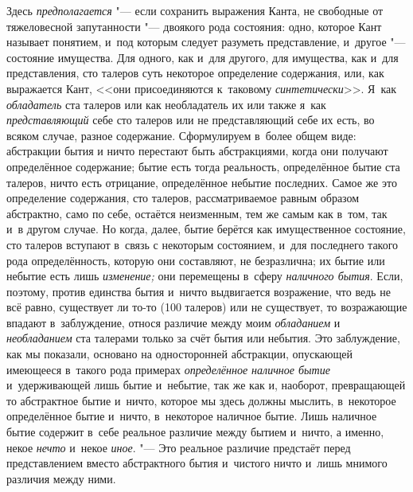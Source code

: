 Здесь {\em предполагается} "--- если сохранить выражения Канта, не свободные от
тяжеловесной запутанности "--- двоякого рода состояния: одно, которое Кант
называет понятием, и~под которым следует разуметь представление, и~другое "---
состояние имущества. Для одного, как и~для другого, для имущества, как и~для
представления, сто талеров суть некоторое определение содержания, или, как
выражается Кант, <<они присоединяются к~таковому {\em синтетически}>>. Я~как
{\em обладатель} ста талеров или как необладатель их или также я~как {\em
представляющий} себе сто талеров или не представляющий себе их есть, во всяком
случае, разное содержание. Сформулируем в~более общем виде: абстракции бытия и
ничто перестают быть абстракциями, когда они получают определённое содержание;
бытие есть тогда реальность, определённое бытие ста талеров, ничто есть
отрицание, определённое небытие последних. Самое же это определение содержания,
сто талеров, рассматриваемое равным образом абстрактно, само по себе, остаётся
неизменным, тем же самым как в~том, так и~в другом случае. Но когда, далее,
бытие берётся как имущественное состояние, сто талеров вступают в~связь с
некоторым состоянием, и~для последнего такого рода определённость, которую они
составляют, не безразлична; их бытие или небытие есть лишь {\em изменение;} они
перемещены в~сферу {\em наличного бытия}. Если, поэтому, против единства бытия
и~ничто выдвигается возражение, что ведь не всё равно, существует ли то-то (100
талеров) или не существует, то возражающие впадают в~заблуждение, относя
различие между моим {\em обладанием} и {\em необладанием} ста талерами только
за счёт бытия или небытия. Это заблуждение, как мы показали, основано на
односторонней абстракции, опускающей имеющееся в~такого рода примерах {\em
определённое наличное бытие} и~удерживающей лишь бытие и~небытие, так же как и,
наоборот, превращающей то абстрактное бытие и~ничто, которое мы здесь должны
мыслить, в~некоторое определённое бытие и~ничто, в~некоторое наличное бытие.
Лишь наличное бытие содержит в~себе реальное различие между бытием и~ничто, а
именно, некое {\em нечто} и~некое {\em иное}. "--- Это реальное различие
предстаёт перед представлением вместо абстрактного бытия и~чистого ничто и~лишь
мнимого различия между ними.

